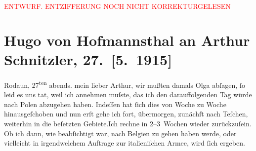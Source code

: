 
\begin{center}
            \textcolor{red}{ENTWURF. ENTZIFFERUNG NOCH NICHT KORREKTURGELESEN}
                      \end{center}
            
               \section[Hugo von Hofmannsthal an Arthur Schnitzler, 27. {[}5. 1915{]}]{ Hugo von Hofmannsthal an Arthur Schnitzler, 27. {[}5. 1915{]}}\nopagebreak{}\rehead{ }\begin{ledgroupsized}[t]{13cm}\normalsize\beginnumbering{} \toendnotes[C]{\smallbreak\pagebreak[2]} 
\pstart
           \raggedleft{}{\pb}Rodaun, 27\textsuperscript{ten}{ }abends.\pend
           \pstart
           mein lieber Arthur, wir mußten damals Olga abſagen, ſo leid es uns tat, weil ich annehmen muſste, das ich den
               darauffolgenden Tag würde nach Polen abzugehen
               haben. Indeſſen hat ſich dies von Woche zu Woche hinausgeſchoben und nun erſt gehe
               ich fort, übermorgen, zunächſt nach Teſchen, weiterhin in die beſetzten
                  Gebiete.\hspace*{1.5em}Ich rechne in 2–3 Wochen {\pb}wieder zurückzuſein. Ob ich dann,
               wie beabſichtigt war, nach Belgien zu gehen haben
               werde, oder vielleicht in irgendwelchem Auftrage zur italieniſchen Armee, wird ſich ergeben.\pend

\end{ledgroupsized}
